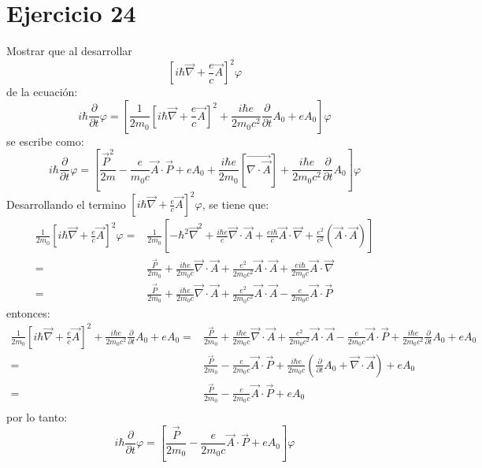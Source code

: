 \section*{Ejercicio 24}
Mostrar que al desarrollar 
\begin{equation*}
    \left[i\hbar \vec{\nabla} + \frac{e}{c}\vec{A}\right]^2 \varphi 
\end{equation*}
de la ecuación:
\begin{equation*}
    i\hbar \frac{\partial}{\partial t} \varphi = \left[\frac{1}{2m_0} \left[i\hbar \vec{\nabla} + \frac{e}{c}\vec{A}\right]^2
    + \frac{i\hbar e}{2m_0 c^2}\frac{\partial }{\partial t}A_0 +e A_0 \right] \varphi
\end{equation*}
se escribe como:
\begin{equation*}
    i\hbar \frac{\partial}{\partial t} \varphi = \left[\frac{{\vec{P}^2}}{2m}-\frac{e}{m_0c}\vec{A}\cdot \vec{P}+eA_0 + \frac{i\hbar e}{2m_0}\left[\vec{\nabla \cdot \vec{A}}\right]+ \frac{i\hbar e}{2m_0c^2}\frac{\partial }{\partial t}A_0\right] \varphi
\end{equation*}
Desarrollando el termino $\left[i\hbar \vec{\nabla} + \frac{e}{c}\vec{A}\right]^2 \varphi $, se tiene que:
\begin{align*}
    \frac{1}{2m_0}\left[i\hbar \vec{\nabla} + \frac{e}{c}\vec{A}\right]^2 \varphi =& \frac{1}{2m_0}\left[-\hbar^2 \vec{\nabla}^2 + \frac{i\hbar e}{c} \vec{\nabla} \cdot \vec{A} + \frac{ei\hbar}{c}\vec{A}\cdot \vec{\nabla} + \frac{e^2}{c^2}(\vec{A}\cdot\vec{A})\right]\\
    =& \frac{\vec{P}}{2m_0}+ \frac{i\hbar e}{2m_0c} \vec{\nabla} \cdot \vec{A} + \frac{e^2}{2m_0c^2}\vec{A}\cdot \vec{A} + \frac{ei\hbar}{2m_0c}\vec{A}\cdot \vec{\nabla} \\
    =& \frac{\vec{P}}{2m_0}+ \frac{i\hbar e}{2m_0c} \vec{\nabla} \cdot \vec{A} + \frac{e^2}{2m_0c^2}\vec{A}\cdot \vec{A} - \frac{e}{2m_0c}\vec{A}\cdot \vec{P} 
\end{align*}
entonces:
\begin{align*}
    \frac{1}{2m_0} \left[i\hbar \vec{\nabla} + \frac{e}{c}\vec{A}\right]^2
    + \frac{i\hbar e}{2m_0 c^2}\frac{\partial }{\partial t}A_0 +e A_0 =&
    \frac{\vec{P}}{2m_0}+ \frac{i\hbar e}{2m_0c} \vec{\nabla} \cdot \vec{A} + \frac{e^2}{2m_0c^2}\vec{A}\cdot \vec{A} - \frac{e}{2m_0c}\vec{A}\cdot \vec{P} +\frac{i\hbar e}{2m_0c^2}\frac{\partial}{\partial t}A_0+eA_0\\
    =&\frac{\vec{P}}{2m_0}- \frac{e}{2m_0c}\vec{A}\cdot \vec{P} +\frac{i\hbar e}{2m_0c}\left(\frac{\partial}{\partial t}A_0+\vec{\nabla} \cdot \vec{A} \right)+eA_0\\
    =&\frac{\vec{P}}{2m_0}- \frac{e}{2m_0c}\vec{A}\cdot \vec{P}+eA_0\\
\end{align*}
por lo tanto:
\begin{equation*}
    i\hbar \frac{\partial}{\partial t} \varphi=\left[\frac{\vec{P}}{2m_0}- \frac{e}{2m_0c}\vec{A}\cdot \vec{P}+eA_0\right]\varphi
\end{equation*}